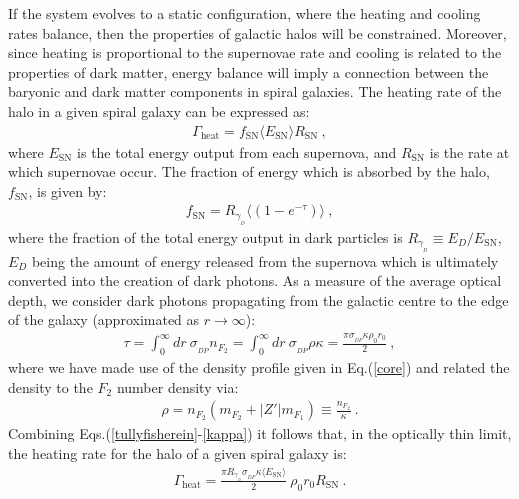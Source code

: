 \documentclass[12pt]{article}
\begin{document}
{{If the system evolves to a static configuration, where the heating and cooling rates  balance, then the properties of galactic halos will be constrained. Moreover, since heating is proportional to the supernovae rate and cooling is related to the properties of dark matter, energy balance will imply a connection between the baryonic and dark matter components in spiral galaxies. The heating rate of the halo in a given spiral galaxy can be expressed as:
%
\begin{eqnarray}
\Gamma _{\text{heat}} = f _{\text{SN}}\langle E _{\text{SN}} \rangle R _{\text{SN}} \ ,
\label{tullyfisherein}
\end{eqnarray}
%
where $E _{\text{SN}}$ is the total energy output from each supernova, and $R _{\text{SN}}$ is the rate at which supernovae occur. The fraction of energy which is absorbed by the halo, $f _{\text{SN}}$, is given by:
%
\begin{eqnarray}
f _{\text{SN}} = R _{\gamma _{_D}}\langle \left (1 - e ^{-\tau} \right )\rangle \ ,
\label{fsn}
\end{eqnarray}
%
where the fraction of the total energy output in dark particles is $R _{\gamma _{_D}} \equiv E _D/E _{\text{SN}}$, $E _D$ being the amount of energy released from the supernova which is ultimately converted into the creation of dark photons. As a measure of the average optical depth, we consider dark photons propagating from the galactic centre to the edge of the galaxy (approximated as $r \rightarrow \infty$):
%
\begin{eqnarray}
\tau = \int _0 ^{\infty} dr \ \sigma _{_{DP}}n _{F_2} = \int _0 ^{\infty} dr \ \sigma _{_{DP}} \rho \kappa = \frac{\pi \sigma _{_{DP}} \kappa \rho _0r _0}{2} \ ,
\label{opticaldepth}
\end{eqnarray}
%
where we have made use of the density profile given in Eq.(\ref{core}) and related the density to the $F _2$ number density via:
%
\begin{eqnarray}
\rho = n _{F_2}(m _{F_2} + |Z'|m _{F_1}) \equiv \frac{n _{F_2}}{\kappa} \ .
\label{kappa}
\end{eqnarray}
%
Combining Eqs.(\ref{tullyfisherein}-\ref{kappa}) it follows that, in the optically thin limit, the heating rate for the halo of a given spiral galaxy is:
%
\begin{eqnarray}
\Gamma _{\text{heat}} = \frac{\pi R _{\gamma _{_D}}\sigma _{_{DP}}\kappa \langle E _{\text{SN}} \rangle}{2} \ \rho _0r _0R _{\text{SN}} \ .
\label{tullyfisherein1}
\end{eqnarray}
%

}}
\end{document}

